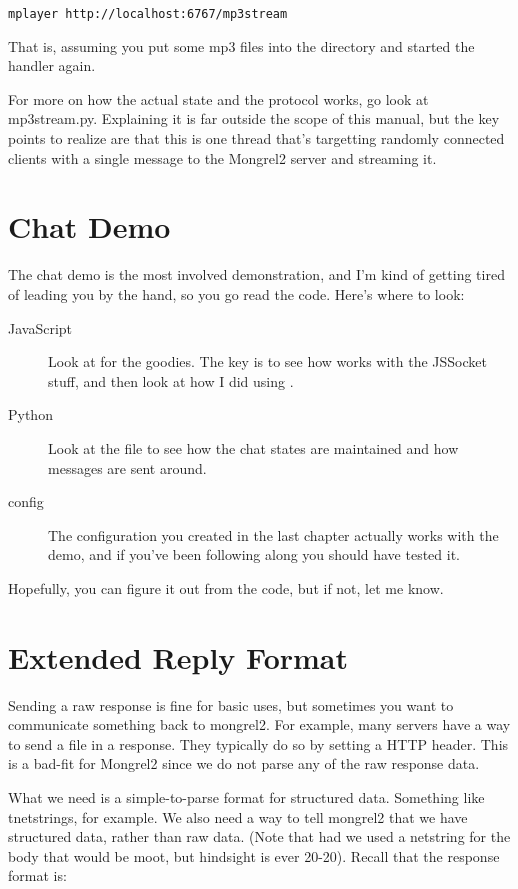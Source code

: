 \begin{Verbatim}
mplayer http://localhost:6767/mp3stream
\end{Verbatim}

That is, assuming you put some mp3 files into the directory and
started the handler again.

For more on how the actual state and the protocol works, go look
at mp3stream.py.  Explaining it is far outside the scope of this manual,
but the key points to realize are that this is one thread that's
targetting randomly connected clients with a single message to the
Mongrel2 server and streaming it.


\section{Chat Demo}

The chat demo is the most involved demonstration, and I'm kind of getting
tired of leading you by the hand, so you go read the code.  Here's where
to look:

\begin{description}
\item [JavaScript] Look at  for the goodies.
    The key is to see how  works with the JSSocket stuff,
    and then look at how I did  using .
\item [Python] Look at the  file to see how
    the chat states are maintained and how messages are sent around.
\item [config] The configuration you created in the last chapter
    actually works with the demo, and if you've been following along
    you should have tested it.
\end{description}

Hopefully, you can figure it out from the code, but if not, let me know.

\section{Extended Reply Format}

Sending a raw response is fine for basic uses, but sometimes you want to
communicate something back to mongrel2.  For example, many servers have
a way to send a file in a response.  They typically do so by setting a HTTP
header.  This is a bad-fit for Mongrel2 since we do not parse any of the raw
response data.

What we need is a simple-to-parse format for structured data.  Something like
tnetstrings, for example.  We also need a way to tell mongrel2 that we have
structured data, rather than raw data.  (Note that had we used a netstring for
the body that would be moot, but hindsight is ever 20-20).  Recall that the
response format is:


